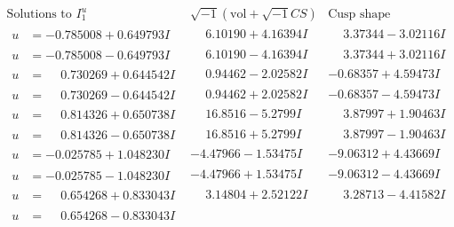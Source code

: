 \documentclass[1p]{elsarticle_modified}
\theoremstyle{definition}
\newcommand{\I}{\sqrt{-1}}
\begin{document}
$$\begin{array}{c|c|c}  
\text{Solutions to }I^u_{1}& \I (\text{vol} + \sqrt{-1}CS) & \text{Cusp shape}\\
 \hline 
\begin{aligned}
u &= -0.785008 + 0.649793 I\end{aligned}
 & \phantom{-}6.10190 + 4.16394 I & \phantom{-}3.37344 - 3.02116 I \\ \hline\begin{aligned}
u &= -0.785008 - 0.649793 I\end{aligned}
 & \phantom{-}6.10190 - 4.16394 I & \phantom{-}3.37344 + 3.02116 I \\ \hline\begin{aligned}
u &= \phantom{-}0.730269 + 0.644542 I\end{aligned}
 & \phantom{-}0.94462 - 2.02582 I & -0.68357 + 4.59473 I \\ \hline\begin{aligned}
u &= \phantom{-}0.730269 - 0.644542 I\end{aligned}
 & \phantom{-}0.94462 + 2.02582 I & -0.68357 - 4.59473 I \\ \hline\begin{aligned}
u &= \phantom{-}0.814326 + 0.650738 I\end{aligned}
 & \phantom{-}16.8516 - 5.2799 I & \phantom{-}3.87997 + 1.90463 I \\ \hline\begin{aligned}
u &= \phantom{-}0.814326 - 0.650738 I\end{aligned}
 & \phantom{-}16.8516 + 5.2799 I & \phantom{-}3.87997 - 1.90463 I \\ \hline\begin{aligned}
u &= -0.025785 + 1.048230 I\end{aligned}
 & -4.47966 - 1.53475 I & -9.06312 + 4.43669 I \\ \hline\begin{aligned}
u &= -0.025785 - 1.048230 I\end{aligned}
 & -4.47966 + 1.53475 I & -9.06312 - 4.43669 I \\ \hline\begin{aligned}
u &= \phantom{-}0.654268 + 0.833043 I\end{aligned}
 & \phantom{-}3.14804 + 2.52122 I & \phantom{-}3.28713 - 4.41582 I \\ \hline\begin{aligned}
u &= \phantom{-}0.654268 - 0.833043 I\end{aligned}

\end{array}$$
\end{document}
